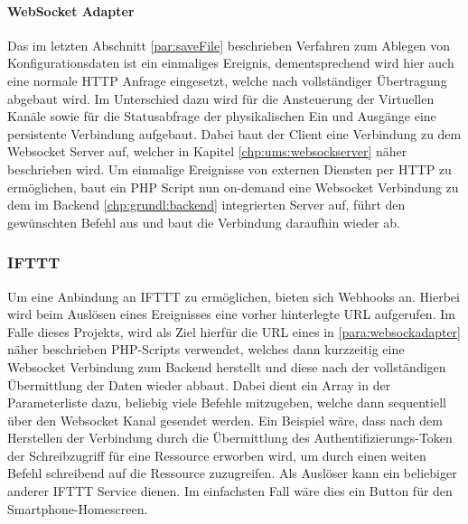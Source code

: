 \paragraph{WebSocket Adapter}\label{para:websockadapter}
Das im letzten Abschnitt \ref {par:saveFile} beschrieben Verfahren zum Ablegen von Konfigurationsdaten ist ein einmaliges Ereignis, dementsprechend wird hier auch eine normale HTTP Anfrage eingesetzt, welche nach vollständiger Übertragung abgebaut wird. Im Unterschied dazu wird für die Ansteuerung der Virtuellen Kanäle sowie für die Statusabfrage der physikalischen Ein und Ausgänge eine persistente Verbindung aufgebaut. Dabei baut der Client eine Verbindung zu dem Websocket Server auf, welcher in Kapitel \ref{chp:ums:websockserver} näher beschrieben wird. Um einmalige Ereignisse von externen Diensten per HTTP zu ermöglichen, baut ein PHP Script nun on-demand eine Websocket Verbindung zu dem im Backend \ref{chp:grundl:backend} integrierten Server auf, führt den gewünschten Befehl aus und baut die Verbindung daraufhin wieder ab. 

\subsubsection{IFTTT}
Um eine Anbindung an IFTTT zu ermöglichen, bieten sich Webhooks an. Hierbei wird beim Auslösen eines Ereignisses eine vorher hinterlegte URL aufgerufen. Im Falle dieses Projekts, wird als Ziel hierfür die URL eines in \autoref{para:websockadapter} näher beschrieben PHP-Scripts verwendet, welches dann kurzzeitig eine Websocket Verbindung zum Backend herstellt und diese nach der vollständigen Übermittlung der Daten wieder abbaut. Dabei dient ein Array in der Parameterliste dazu, beliebig viele Befehle mitzugeben, welche dann sequentiell über den Websocket Kanal gesendet werden. Ein Beispiel wäre, dass nach dem Herstellen der Verbindung durch die Übermittlung des Authentifizierungs-Token der Schreibzugriff für eine Ressource erworben wird, um durch einen weiten Befehl schreibend auf die Ressource zuzugreifen. Als Auslöser kann ein beliebiger anderer IFTTT Service dienen. Im einfachsten Fall wäre dies ein Button für den Smartphone-Homescreen.  



\clearpage


